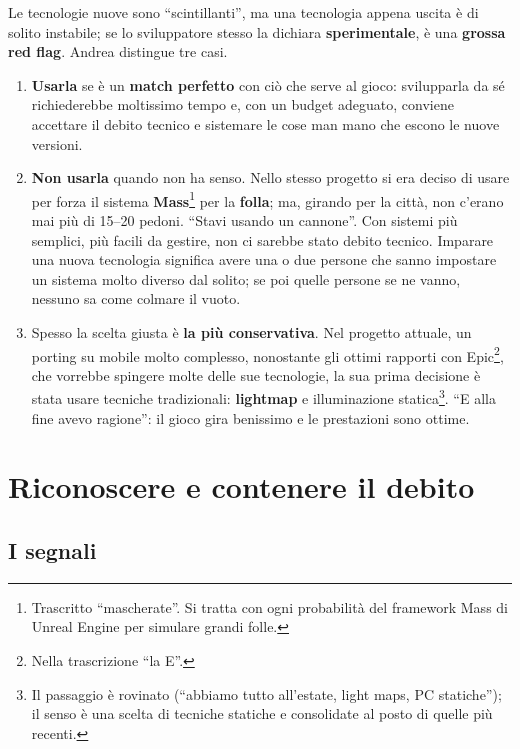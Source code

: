 Le tecnologie nuove sono ``scintillanti'', ma una tecnologia appena uscita è di
solito instabile; se lo sviluppatore stesso la dichiara \textbf{sperimentale}, è
una \textbf{grossa red flag}. Andrea distingue tre casi.
\begin{enumerate}
  \item \textbf{Usarla} se è un \textbf{match perfetto} con ciò che serve al
        gioco: svilupparla da sé richiederebbe moltissimo tempo e, con un budget
        adeguato, conviene accettare il debito tecnico e sistemare le cose man mano
        che escono le nuove versioni.
  \item \textbf{Non usarla} quando non ha senso. Nello stesso progetto si era
        deciso di usare per forza il sistema \textbf{Mass}\footnote{Trascritto
        ``mascherate''. Si tratta con ogni probabilità del framework Mass di Unreal
        Engine per simulare grandi folle.} per la \textbf{folla}; ma, girando per la
        città, non c'erano mai più di 15--20 pedoni. ``Stavi usando un cannone''.
        Con sistemi più semplici, più facili da gestire, non ci sarebbe stato
        debito tecnico. Imparare una nuova tecnologia significa avere una o due
        persone che sanno impostare un sistema molto diverso dal solito; se poi
        quelle persone se ne vanno, nessuno sa come colmare il vuoto.
  \item Spesso la scelta giusta è \textbf{la più conservativa}. Nel progetto
        attuale, un porting su mobile molto complesso, nonostante gli ottimi rapporti
        con Epic\footnote{Nella trascrizione ``la E''.}, che vorrebbe spingere molte
        delle sue tecnologie, la sua prima decisione è stata usare tecniche
        tradizionali: \textbf{lightmap} e illuminazione statica\footnote{Il
        passaggio è rovinato (``abbiamo tutto all'estate, light maps, PC
        statiche''); il senso è una scelta di tecniche statiche e consolidate al
        posto di quelle più recenti.}. ``E alla fine avevo ragione'': il gioco gira
        benissimo e le prestazioni sono ottime.
\end{enumerate}

\section{Riconoscere e contenere il debito}
\label{sec:c3-2-riconoscere}

\subsection{I segnali}

